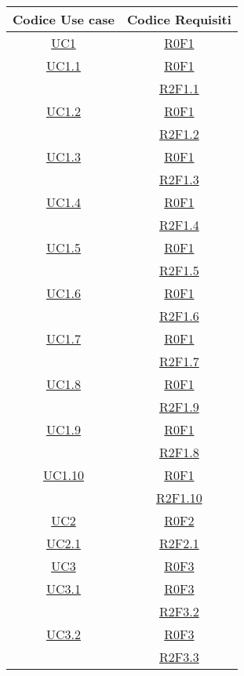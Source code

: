 \clearpage
\normalsize
\begin{longtable}{|c|c|}
\hline
\textbf{Codice Use case} & \textbf{Codice Requisiti} \\
\hline
\endhead
\hyperlink{UC1}{UC1} & \hyperlink{R0F1}{R0F1}\\
\hline
\hyperlink{UC1.1}{UC1.1} & \hyperlink{R0F1}{R0F1}\\
& \hyperlink{R2F1.1}{R2F1.1}\\
\hline
\hyperlink{UC1.2}{UC1.2} & \hyperlink{R0F1}{R0F1}\\
& \hyperlink{R2F1.2}{R2F1.2}\\
\hline
\hyperlink{UC1.3}{UC1.3} & \hyperlink{R0F1}{R0F1}\\
& \hyperlink{R2F1.3}{R2F1.3}\\
\hline
\hyperlink{UC1.4}{UC1.4} & \hyperlink{R0F1}{R0F1}\\
& \hyperlink{R2F1.4}{R2F1.4}\\
\hline
\hyperlink{UC1.5}{UC1.5} & \hyperlink{R0F1}{R0F1}\\
& \hyperlink{R2F1.5}{R2F1.5}\\
\hline
\hyperlink{UC1.6}{UC1.6} & \hyperlink{R0F1}{R0F1}\\
& \hyperlink{R2F1.6}{R2F1.6}\\
\hline
\hyperlink{UC1.7}{UC1.7} & \hyperlink{R0F1}{R0F1}\\
& \hyperlink{R2F1.7}{R2F1.7}\\
\hline
\hyperlink{UC1.8}{UC1.8} & \hyperlink{R0F1}{R0F1}\\
& \hyperlink{R2F1.9}{R2F1.9}\\
\hline
\hyperlink{UC1.9}{UC1.9} & \hyperlink{R0F1}{R0F1}\\
& \hyperlink{R2F1.8}{R2F1.8}\\
\hline
\hyperlink{UC1.10}{UC1.10} & \hyperlink{R0F1}{R0F1}\\
& \hyperlink{R2F1.10}{R2F1.10}\\
\hline
\hyperlink{UC2}{UC2} & \hyperlink{R0F2}{R0F2}\\
\hline
\hyperlink{UC2.1}{UC2.1} & \hyperlink{R2F2.1}{R2F2.1}\\
\hline
\hyperlink{UC3}{UC3} & \hyperlink{R0F3}{R0F3}\\
\hline
\hyperlink{UC3.1}{UC3.1} & \hyperlink{R0F3}{R0F3}\\
& \hyperlink{R2F3.2}{R2F3.2}\\
\hline
\hyperlink{UC3.2}{UC3.2} & \hyperlink{R0F3}{R0F3}\\
& \hyperlink{R2F3.3}{R2F3.3}\\

\end{longtable}
